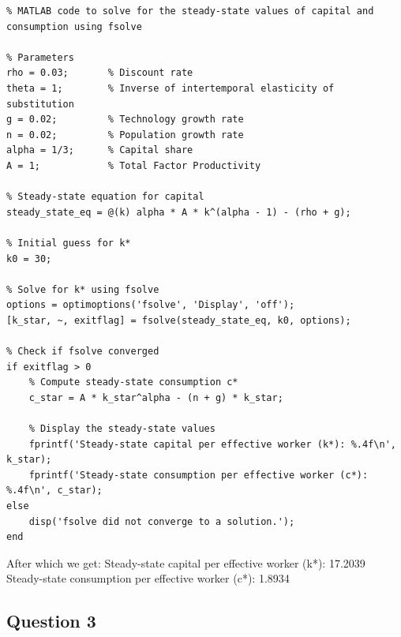 \documentclass{article}
\begin{document}
\begin{lstlisting}
% MATLAB code to solve for the steady-state values of capital and consumption using fsolve

% Parameters
rho = 0.03;       % Discount rate
theta = 1;        % Inverse of intertemporal elasticity of substitution
g = 0.02;         % Technology growth rate
n = 0.02;         % Population growth rate
alpha = 1/3;      % Capital share
A = 1;            % Total Factor Productivity

% Steady-state equation for capital
steady_state_eq = @(k) alpha * A * k^(alpha - 1) - (rho + g);

% Initial guess for k*
k0 = 30;

% Solve for k* using fsolve
options = optimoptions('fsolve', 'Display', 'off');
[k_star, ~, exitflag] = fsolve(steady_state_eq, k0, options);

% Check if fsolve converged
if exitflag > 0
    % Compute steady-state consumption c*
    c_star = A * k_star^alpha - (n + g) * k_star;

    % Display the steady-state values
    fprintf('Steady-state capital per effective worker (k*): %.4f\n', k_star);
    fprintf('Steady-state consumption per effective worker (c*): %.4f\n', c_star);
else
    disp('fsolve did not converge to a solution.');
end
\end{lstlisting}
After which we get: Steady-state capital per effective worker (k*): 17.2039\\
Steady-state consumption per effective worker (c*): 1.8934\\

\subsection*{Question 3}
\end{document}
